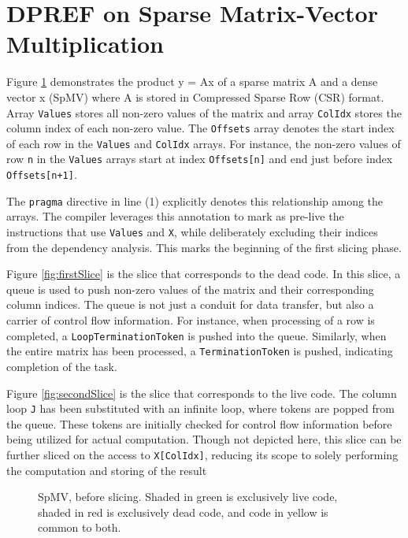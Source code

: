 \documentclass{acaces}
\begin{document}
\section{DPREF on Sparse Matrix-Vector Multiplication}

Figure \ref{fig:spmv} demonstrates the product y = Ax of a sparse matrix A and a dense vector x (SpMV) where A is stored in Compressed Sparse Row (CSR) format.
Array \texttt{Values} stores all non-zero values of the matrix and array \texttt{ColIdx} stores the column index of each non-zero value.
The \texttt{Offsets} array denotes the start index of each row in the \texttt{Values} and \texttt{ColIdx} arrays.
For instance, the non-zero values of row \texttt{n} in the \texttt{Values} arrays start at index \texttt{Offsets[n]}
and end just before index \texttt{Offsets[n+1]}.

The \texttt{pragma} directive in line (1) explicitly denotes this relationship among the arrays.
The compiler leverages this annotation to mark as pre-live the instructions that use \texttt{Values} and \texttt{X},
while deliberately excluding their indices from the dependency analysis.
This marks the beginning of the first slicing phase.

Figure \ref{fig:firstSlice} is the slice that corresponds to the dead code.
In this slice, a queue is used to push non-zero values of the matrix and their corresponding column indices.
The queue is not just a conduit for data transfer, but also a carrier of control flow information.
For instance, when processing of a row is completed, a \texttt{LoopTerminationToken} is pushed into the queue.
Similarly, when the entire matrix has been processed, a \texttt{TerminationToken} is pushed, indicating completion of the task.

Figure \ref{fig:secondSlice} is the slice that corresponds to the live code.
The column loop \texttt{J} has been substituted with an infinite loop,
where tokens are popped from the queue.
These tokens are initially checked for control flow information before being utilized for actual computation.
Though not depicted here, this slice can be further sliced on the access to \texttt{X[ColIdx]},
reducing its scope to solely performing the computation and storing of the result

\begin{figure}[ht]
  \centering
  
  \caption{SpMV, before slicing. Shaded in green is exclusively live code, shaded in red is exclusively dead code, and code in yellow is common to both. }
  \label{fig:spmv}
\end{figure}
\end{document}
